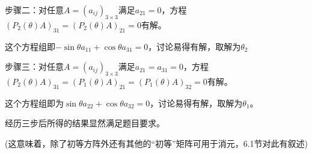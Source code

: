 \documentclass[a4paper,UTF8,fontset=windows]{ctexart}
\begin{document}
\begin{enumerate}
步骤二：对任意$A=\left(a_{ij}\right)_{3\times3}$满足$a_{21}=0$，方程$\left(P_2(\theta)A\right)_{31}=\left(P_2(\theta)A\right)_{21}=0$有解。

这个方程组即$-\sin{\theta}a_{11}+\cos{\theta}a_{31}=0$，讨论易得有解，取解为$\theta_2$

步骤三：对任意$A=\left(a_{ij}\right)_{3\times3}$满足$a_{21}=a_{31}=0$，方程$\left(P_2(\theta)A\right)_{31}=\left(P_1(\theta)A\right)_{21}=\left(P_1(\theta)A\right)_{32}=0$有解。

这个方程组即为$\sin{\theta}a_{22}+\cos{\theta}a_{32}=0$，讨论易得有解，取解为$\theta_1$。

经历三步后所得的结果显然满足题目要求。

(这意味着，除了初等方阵外还有其他的“初等”矩阵可用于消元，6.1节对此有叙述)
\end{enumerate}
\end{document}
